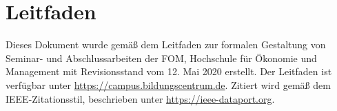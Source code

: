 \section*{Leitfaden}

\thispagestyle{Leitfaden}

Dieses Dokument wurde gemäß dem Leitfaden zur formalen Gestaltung von Seminar- und Abschlussarbeiten der FOM, Hochschule für Ökonomie und Management mit Revisionsstand vom 12. Mai 2020 erstellt. Der Leitfaden ist verfügbar unter \href{https://campus.bildungscentrum.de/nfcampus/dc/4875/LeitfadenZurFormalenGestaltungSeminarAbschlussarbeiten_BCW_Stud_2020_04_29.pdf}{https://campus.bildungscentrum.de}.\newline
Zitiert wird gemäß dem \acrshort{IEEE}-Zitationsstil, beschrieben unter \href{https://ieee-dataport.org/sites/default/files/analysis/27/IEEE\%20Citation\%20Guidelines.pdf}{https://ieee-dataport.org}.

\newpage
